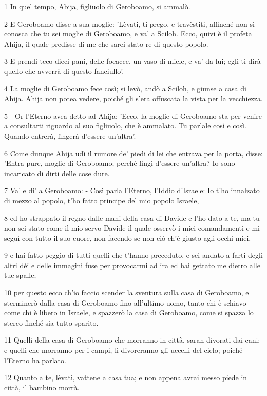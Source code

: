 \par 1 In quel tempo, Abija, figliuolo di Geroboamo, si ammalò.
\par 2 E Geroboamo disse a sua moglie: 'Lèvati, ti prego, e travèstiti, affinché non si conosca che tu sei moglie di Geroboamo, e va' a Sciloh. Ecco, quivi è il profeta Ahija, il quale predisse di me che sarei stato re di questo popolo.
\par 3 E prendi teco dieci pani, delle focacce, un vaso di miele, e va' da lui; egli ti dirà quello che avverrà di questo fanciullo'.
\par 4 La moglie di Geroboamo fece così; si levò, andò a Sciloh, e giunse a casa di Ahija. Ahija non potea vedere, poiché gli s'era offuscata la vista per la vecchiezza.
\par 5 - Or l'Eterno avea detto ad Ahija: 'Ecco, la moglie di Geroboamo sta per venire a consultarti riguardo al suo figliuolo, che è ammalato. Tu parlale così e così. Quando entrerà, fingerà d'essere un'altra'. -
\par 6 Come dunque Ahija udì il rumore de' piedi di lei che entrava per la porta, disse: 'Entra pure, moglie di Geroboamo; perché fingi d'essere un'altra? Io sono incaricato di dirti delle cose dure.
\par 7 Va' e di' a Geroboamo: - Così parla l'Eterno, l'Iddio d'Israele: Io t'ho innalzato di mezzo al popolo, t'ho fatto principe del mio popolo Israele,
\par 8 ed ho strappato il regno dalle mani della casa di Davide e l'ho dato a te, ma tu non sei stato come il mio servo Davide il quale osservò i miei comandamenti e mi seguì con tutto il suo cuore, non facendo se non ciò ch'è giusto agli occhi miei,
\par 9 e hai fatto peggio di tutti quelli che t'hanno preceduto, e sei andato a farti degli altri dèi e delle immagini fuse per provocarmi ad ira ed hai gettato me dietro alle tue spalle;
\par 10 per questo ecco ch'io faccio scender la sventura sulla casa di Geroboamo, e sterminerò dalla casa di Geroboamo fino all'ultimo uomo, tanto chi è schiavo come chi è libero in Israele, e spazzerò la casa di Geroboamo, come si spazza lo sterco finché sia tutto sparito.
\par 11 Quelli della casa di Geroboamo che morranno in città, saran divorati dai cani; e quelli che morranno per i campi, li divoreranno gli uccelli del cielo; poiché l'Eterno ha parlato.
\par 12 Quanto a te, lèvati, vattene a casa tua; e non appena avrai messo piede in città, il bambino morrà.
